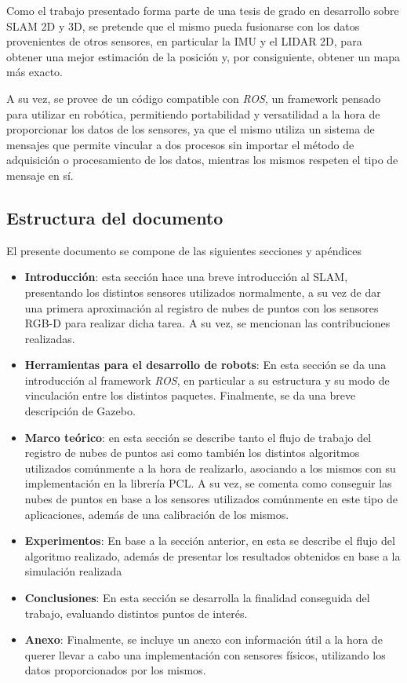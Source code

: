 Como el trabajo presentado forma parte de una tesis de grado en desarrollo sobre SLAM 2D y 3D, se pretende que el mismo pueda fusionarse con los datos provenientes de otros sensores, en particular la IMU y el LIDAR 2D, para obtener una mejor estimación de la posición y, por consiguiente, obtener un mapa más exacto.

A su vez, se provee de un código compatible con \textit{ROS}, un framework pensado para utilizar en robótica, permitiendo portabilidad y versatilidad a la hora de proporcionar los datos de los sensores, ya que el mismo utiliza un sistema de mensajes que permite vincular a dos procesos sin importar el método de adquisición o procesamiento de los datos, mientras los mismos respeten el tipo de mensaje en sí.

\subsection{Estructura del documento}
El presente documento se compone de las siguientes secciones
\ifimagenespaper
\else
y apéndices
\fi
\begin{itemize}
    \item \textbf{Introducción}: esta sección hace una breve introducción al SLAM, presentando los distintos sensores utilizados normalmente, a su vez de dar una primera aproximación al registro de nubes de puntos con los sensores RGB-D para realizar dicha tarea. A su vez, se mencionan las contribuciones realizadas.
    \ifimagenespaper
    \else
    \item \textbf{Herramientas para el desarrollo de robots}: En esta sección se da una introducción al framework \textit{ROS}, en particular a su estructura y su modo de vinculación entre los distintos paquetes. Finalmente, se da una breve descripción de Gazebo.
    \fi
    \item \textbf{Marco teórico}: en esta sección se describe tanto el flujo de trabajo del registro de nubes de puntos asi como también los distintos algoritmos utilizados comúnmente a la hora de realizarlo, asociando a los mismos con su implementación en la librería PCL. A su vez, se comenta como conseguir las nubes de puntos en base a los sensores utilizados comúnmente en este tipo de aplicaciones, además de una calibración de los mismos.
    \item \textbf{Experimentos}: En base a la sección anterior, en esta se describe el flujo del algoritmo realizado, además de presentar los resultados obtenidos en base a la simulación realizada
    \item \textbf{Conclusiones}: En esta sección se desarrolla la finalidad conseguida del trabajo, evaluando distintos puntos de interés.
    \ifimagenespaper
    \else
    \item \textbf{Anexo}: Finalmente, se incluye un anexo con información útil a la hora de querer llevar a cabo una implementación con sensores físicos, utilizando los datos proporcionados por los mismos.
    \fi
\end{itemize}
